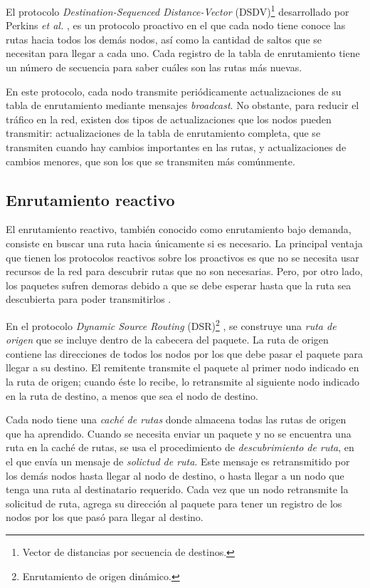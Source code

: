 El protocolo \textit{Destination-Sequenced Distance-Vector}
(DSDV)\footnote{Vector de distancias por secuencia de destinos.} desarrollado
por Perkins \textit{et al.} \cite{Perkins1994}, es un protocolo proactivo en el
que cada nodo tiene conoce las rutas hacia todos los demás nodos, así como la
cantidad de saltos que se necesitan para llegar a cada uno. Cada registro de la
tabla de enrutamiento tiene un número de secuencia para saber cuáles son las
rutas más nuevas.

En este protocolo, cada nodo transmite periódicamente actualizaciones de su
tabla de enrutamiento mediante mensajes \textit{broadcast}. No obstante, para
reducir el tráfico en la red, existen dos tipos de actualizaciones que los
nodos pueden transmitir: actualizaciones de la tabla de enrutamiento completa,
que se transmiten cuando hay cambios importantes en las rutas, y actualizaciones
de cambios menores, que son los que se transmiten más comúnmente.

\subsection{Enrutamiento reactivo}
\label{subsec:enrutamiento_reactivo}

El enrutamiento reactivo, también conocido como enrutamiento bajo demanda,
consiste en buscar una ruta hacia únicamente si es necesario. La principal
ventaja que tienen los protocolos reactivos sobre los proactivos es que no se
necesita usar recursos de la red para descubrir rutas que no son necesarias.
Pero, por otro lado, los paquetes sufren demoras debido a que se debe esperar
hasta que la ruta sea descubierta para poder transmitirlos \cite{Wenden2005}.

En el protocolo \textit{Dynamic Source Routing} (DSR)\footnote{Enrutamiento de
origen dinámico.} \cite{Johnson1996}, se construye una \textit{ruta de origen}
que se incluye dentro de la cabecera del paquete. La ruta de origen contiene
las direcciones de todos los nodos por los que debe pasar el paquete para llegar
a su destino. El remitente transmite el paquete al primer nodo indicado en la
ruta de origen; cuando éste lo recibe, lo retransmite al siguiente nodo
indicado en la ruta de destino, a menos que sea el nodo de destino.

Cada nodo tiene una \textit{caché de rutas} donde almacena todas las rutas de
origen que ha aprendido. Cuando se necesita enviar un paquete y no se encuentra
una ruta en la caché de rutas, se usa el procedimiento de \textit{descubrimiento
de ruta}, en el que envía un mensaje de \textit{solictud de ruta}. Este mensaje
es retransmitido por los demás nodos hasta llegar al nodo de destino, o hasta
llegar a un nodo que tenga una ruta al destinatario requerido. Cada vez que un
nodo retransmite la solicitud de ruta, agrega su dirección al paquete para
tener un registro de los nodos por los que pasó para llegar al destino.

